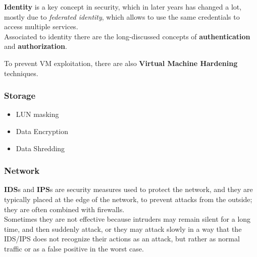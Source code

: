 \textbf{Identity} is a key concept in security, which in later years has changed a lot, mostly due to \textit{federated identity}, which allows to use the same credentials to access multiple services.\\
Associated to identity there are the long-discussed concepts of \textbf{authentication} and \textbf{authorization}.\\

To prevent VM exploitation, there are also \textbf{Virtual Machine Hardening} techniques.

\subsubsection{Storage}
\begin{itemize}
   \item LUN masking
   \item Data Encryption
   \item Data Shredding
\end{itemize}

\subsubsection{Network}

\textbf{IDS}s and \textbf{IPS}s are security measures used to protect the network, and they are typically placed at the edge of the network, to prevent attacks from the outside;
they are often combined with firewalls.\\
Sometimes they are not effective because intruders may remain silent for a long time, and then suddenly attack, or they may attack slowly in a way that the IDS/IPS does not recognize their actions as an attack, but rather as normal traffic or as a false positive in the worst case.

